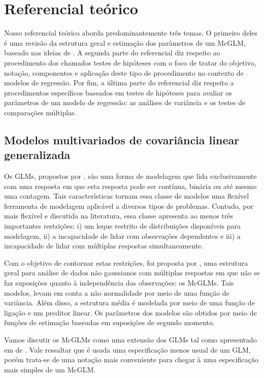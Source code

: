 \chapter{Referencial teórico}

Nosso referencial teórico aborda predominantemente três temas. O primeiro deles é uma revisão da estrutura geral e estimação dos parâmetros de um McGLM, baseado nas ideias de \citet{Bonat16}. A segunda parte do referencial diz respeito ao procedimento dos chamados testes de hipóteses com o foco de tratar do objetivo, notação, componentes e aplicação deste tipo de procedimento no contexto de modelos de regressão. Por fim, a última parte do referencial diz respeito a procedimentos específicos baseados em testes de hipóteses para avaliar os parâmetros de um modelo de regressão: as análises de variância e os testes de comparações múltiplas.


\section{Modelos multivariados de covariância linear generalizada}

Os GLMs, propostos por \citet{Nelder72}, são uma forma de modelagem que lida exclusivamente com uma resposta em que esta resposta pode ser contínua, binária ou até mesmo uma contagem. Tais características tornam essa classe de modelos uma flexível ferramenta de modelagem aplicável a diversos tipos de problemas. Contudo, por mais flexível e discutida na literatura, essa classe apresenta ao menos três importantes restrições: i) um leque restrito de distribuições disponíveis para modelagem, ii) a incapacidade de lidar com observações dependentes e iii) a incapacidade de lidar com múltiplas respostas simultaneamente. 

Com o objetivo de contornar estas restrições, foi proposta por \citet{Bonat16}, uma estrutura geral para análise de dados não gaussianos com múltiplas respostas em que não se faz suposições quanto à independência das observações: os McGLMs. Tais modelos, levam em conta a não normalidade por meio de uma função de variância. Além disso, a estrutura média é modelada por meio de uma função de ligação e um preditor linear. Os parâmetros dos modelos são obtidos por meio de funções de estimação baseadas em suposições de segundo momento.

Vamos discutir os McGLMs como uma extensão dos GLMs tal como apresentado em de \citet{Bonat16}. Vale ressaltar que é usada uma especificação menos usual de um GLM, porém trata-se de uma notação mais conveniente para chegar à uma especificação mais simples de um McGLM.

